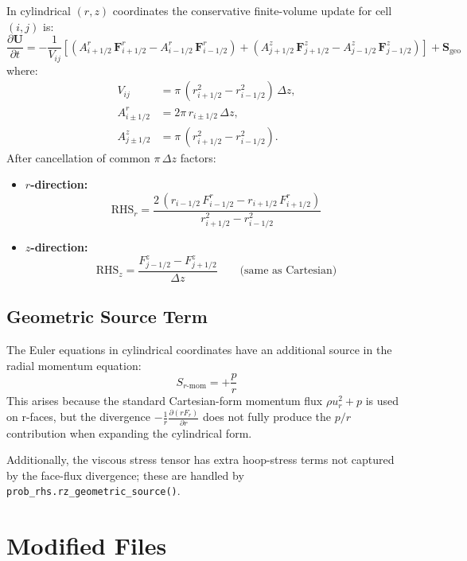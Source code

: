 \documentclass[11pt,a4paper]{article}
\begin{document}
In cylindrical $(r,z)$ coordinates the conservative finite-volume update
for cell $(i,j)$ is:
\[
  \frac{\partial \mathbf{U}}{\partial t}
  = -\frac{1}{V_{ij}} \left[
      \left(A^r_{i+1/2}\,\mathbf{F}^r_{i+1/2} - A^r_{i-1/2}\,\mathbf{F}^r_{i-1/2}\right)
    + \left(A^z_{j+1/2}\,\mathbf{F}^z_{j+1/2} - A^z_{j-1/2}\,\mathbf{F}^z_{j-1/2}\right)
  \right]
  + \mathbf{S}_{\text{geo}}
\]
where:
\begin{align}
  V_{ij}         &= \pi\,(r_{i+1/2}^2 - r_{i-1/2}^2)\,\Delta z, \\
  A^r_{i\pm1/2}  &= 2\pi\,r_{i\pm1/2}\,\Delta z, \\
  A^z_{j\pm1/2}  &= \pi\,(r_{i+1/2}^2 - r_{i-1/2}^2).
\end{align}
After cancellation of common $\pi\,\Delta z$ factors:
\begin{itemize}
  \item \textbf{$r$-direction:}
    \[
      \text{RHS}_r = \frac{2\,(r_{i-1/2}\,F^r_{i-1/2} - r_{i+1/2}\,F^r_{i+1/2})}
                          {r_{i+1/2}^2 - r_{i-1/2}^2}
    \]
  \item \textbf{$z$-direction:}
    \[
      \text{RHS}_z = \frac{F^z_{j-1/2} - F^z_{j+1/2}}{\Delta z}
      \qquad \text{(same as Cartesian)}
    \]
\end{itemize}

\subsection{Geometric Source Term}

The Euler equations in cylindrical coordinates have an additional source
in the radial momentum equation:
\[
  S_{r\text{-mom}} = +\frac{p}{r}
\]
This arises because the standard Cartesian-form momentum flux
$\rho u_r^2 + p$ is used on r-faces, but the divergence
$-\frac{1}{r}\frac{\partial(r F_r)}{\partial r}$ does not fully produce
the $p/r$ contribution when expanding the cylindrical form.

Additionally, the viscous stress tensor has extra hoop-stress terms not
captured by the face-flux divergence; these are handled by
\texttt{prob\_rhs.rz\_geometric\_source()}.

\section{Modified Files}
\end{document}
